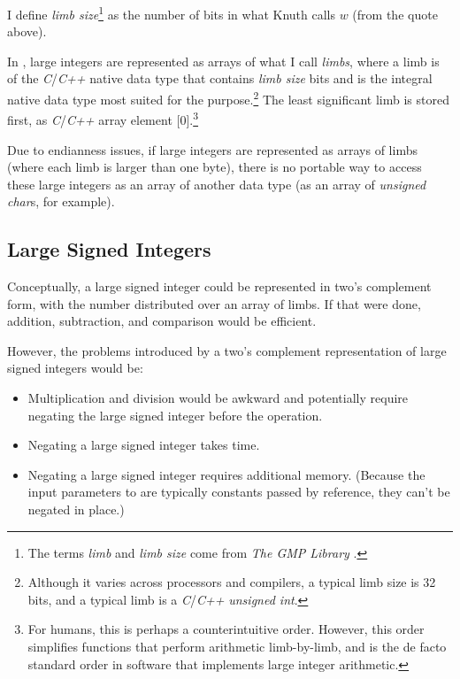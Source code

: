 I define \emph{limb size}\footnote{The terms \emph{limb} 
and \emph{limb size} come from \emph{The GMP Library} 
\cite{bibref:w:gmplibhomepage}.} as the number of bits in 
what Knuth calls $w$ (from the quote above).  

In \emph{\productbasenameshort{}}, large integers are 
represented as arrays of what I call \emph{limbs}, where a 
limb is of the \emph{C}/\emph{C++} native data type that 
contains \emph{limb size} bits and is the integral native 
data type most suited for the purpose.\footnote{Although it 
varies across processors and compilers, a typical limb size 
is 32 bits, and a typical limb is a \emph{C}/\emph{C++} 
\emph{unsigned int}.} The least significant limb is stored 
first, as \emph{C}/\emph{C++} array element 
[0].\footnote{For humans, this is perhaps a counterintuitive 
order.  However, this order simplifies functions that 
perform arithmetic limb-by-limb, and is the de facto 
standard order in software that implements large integer 
arithmetic.} 

Due to endianness issues, if large integers are represented 
as arrays of limbs (where each limb is larger than one 
byte), there is no portable way to access these large 
integers as an array of another data type (as an array of 
\emph{unsigned char}s, for example).  


\subsection{Large Signed Integers}
\label{cldd0:srnm0:srls0}

Conceptually, a large signed integer could be represented in 
two's complement form, with the 
number distributed over an array of limbs.  If that were 
done, addition, subtraction, and comparison would be 
efficient.  

However, the problems introduced by a two's complement 
representation of large signed integers would be: 

\begin{itemize}
\item Multiplication and division would be awkward and
      potentially require negating the large signed integer
      before the
      operation.
\item Negating a large signed integer takes time.
\item Negating a large signed integer requires additional
      memory\@.  (Because
      the input parameters to \emph{\productbasenameshort{}}
      are typically
      constants passed by reference, they can't be negated
      in place.)
\end{itemize}

